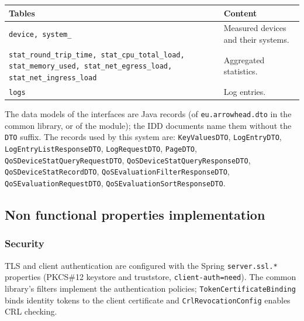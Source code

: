 \documentclass[a4paper]{arrowhead}
\begin{document}
\noindent\begin{longtable}{| p{6.4cm} | p{8.8cm} |} \hline
\rowcolor{gray!33} Tables & Content \\ \hline \endhead
\texttt{device,\allowbreak{} system\_\allowbreak{}} & Measured devices and their systems. \\ \hline
\texttt{stat\_\allowbreak{}round\_\allowbreak{}trip\_\allowbreak{}time,\allowbreak{} stat\_\allowbreak{}cpu\_\allowbreak{}total\_\allowbreak{}load,\allowbreak{} stat\_\allowbreak{}memory\_\allowbreak{}used,\allowbreak{} stat\_\allowbreak{}net\_\allowbreak{}egress\_\allowbreak{}load,\allowbreak{} stat\_\allowbreak{}net\_\allowbreak{}ingress\_\allowbreak{}load} & Aggregated statistics. \\ \hline
\texttt{logs} & Log entries. \\ \hline
\end{longtable}

The data models of the interfaces are Java records (of \texttt{eu.arrowhead.dto} in the common library, or of the module); the IDD documents name them without the \texttt{DTO} suffix. The records used by this system are: \texttt{KeyValuesDTO}, \texttt{LogEntryDTO}, \texttt{Log\allowbreak{}Entry\allowbreak{}List\allowbreak{}Response\allowbreak{}DTO}, \texttt{LogRequestDTO}, \texttt{PageDTO}, \texttt{Qo\allowbreak{}SDevice\allowbreak{}Stat\allowbreak{}Query\allowbreak{}Request\allowbreak{}DTO}, \texttt{Qo\allowbreak{}SDevice\allowbreak{}Stat\allowbreak{}Query\allowbreak{}Response\allowbreak{}DTO}, \texttt{Qo\allowbreak{}SDevice\allowbreak{}Stat\allowbreak{}Record\allowbreak{}DTO}, \texttt{Qo\allowbreak{}SEvaluation\allowbreak{}Filter\allowbreak{}Response\allowbreak{}DTO}, \texttt{Qo\allowbreak{}SEvaluation\allowbreak{}Request\allowbreak{}DTO}, \texttt{Qo\allowbreak{}SEvaluation\allowbreak{}Sort\allowbreak{}Response\allowbreak{}DTO}.

\subsection{Non functional properties implementation}

\subsubsection{Security}

TLS and client authentication are configured with the Spring \texttt{server.\allowbreak{}ssl.\allowbreak{}*} properties (PKCS\#12 keystore and truststore, \texttt{client-\allowbreak{}auth=\allowbreak{}need}). The common library's filters implement the authentication policies; \texttt{Token\allowbreak{}Certificate\allowbreak{}Binding} binds identity tokens to the client certificate and \texttt{Crl\allowbreak{}Revocation\allowbreak{}Config} enables CRL checking.
\end{document}
